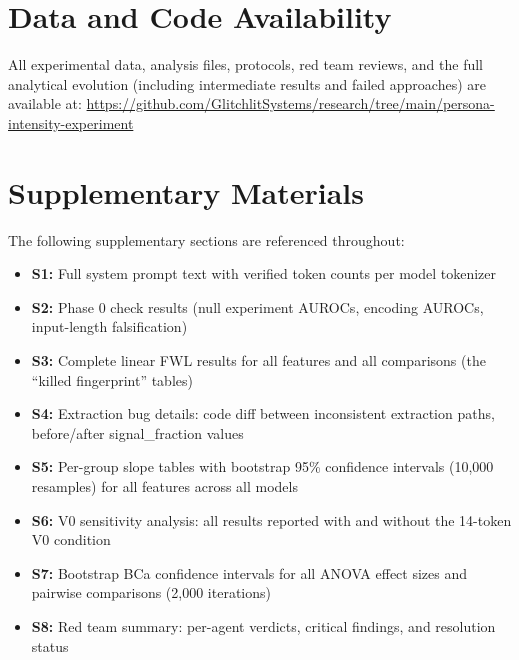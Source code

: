 \documentclass[11pt]{article}
\begin{document}
\section*{Data and Code Availability}

All experimental data, analysis files, protocols, red team reviews, and the full analytical evolution (including intermediate results and failed approaches) are available at: \url{https://github.com/GlitchlitSystems/research/tree/main/persona-intensity-experiment}

\section*{Supplementary Materials}

The following supplementary sections are referenced throughout:

\begin{itemize}
  \item \textbf{S1:} Full system prompt text with verified token counts per model tokenizer
  \item \textbf{S2:} Phase 0 check results (null experiment AUROCs, encoding AUROCs, input-length falsification)
  \item \textbf{S3:} Complete linear FWL results for all features and all comparisons (the ``killed fingerprint'' tables)
  \item \textbf{S4:} Extraction bug details: code diff between inconsistent extraction paths, before/after signal\_fraction values
  \item \textbf{S5:} Per-group slope tables with bootstrap 95\% confidence intervals (10,000 resamples) for all features across all models
  \item \textbf{S6:} V0 sensitivity analysis: all results reported with and without the 14-token V0 condition
  \item \textbf{S7:} Bootstrap BCa confidence intervals for all ANOVA effect sizes and pairwise comparisons (2,000 iterations)
  \item \textbf{S8:} Red team summary: per-agent verdicts, critical findings, and resolution status
\end{itemize}



\end{document}
